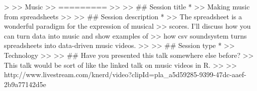 >
>> Music
>> =========
>>
>> ## Session title *
>> Making music from spreadsheets
>>
>> ## Session description *
>> The spreadsheet is a wonderful paradigm for the expression of musical
>> scores. I'll discuss how you can turn data into music and show examples of
>> how csv soundsystem turns spreadsheets into data-driven music videos.
>>
>> ## Session type *
>> Technology
>>
>> ## Have you presented this talk somewhere else before?
>> This talk would be sort of like the linked talk on music videos in R.
>>
>> http://www.livestream.com/knerd/video?clipId=pla_a5d59285-9399-47dc-aaef-2b9a77142d5e
